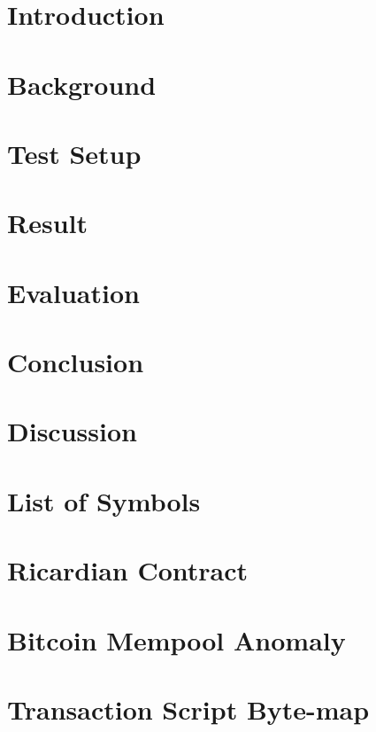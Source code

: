 \documentclass[Nomencl]{DylanMaster}
\begin{document}
\mytitlepage

\newpage

\tableofcontents

\newpage
\section{Introduction}


\newpage
\section{Background}


\newpage
\section{Test Setup}


\newpage
\section{Result}


\newpage
\section{Evaluation}


\newpage
\section{Conclusion}


\newpage
\section{Discussion}


\newpage
\appendix
\section{List of Symbols}


\newpage
\section{Ricardian Contract}


\newpage
\section{Bitcoin Mempool Anomaly}


\newpage
\section{Transaction Script Byte-map}


\newpage


\end{document}
